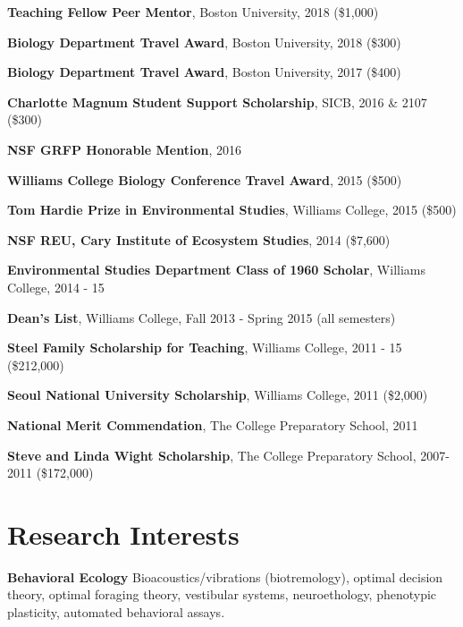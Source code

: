 \documentclass[margin,line]{res}
\begin{document}
\begin{resume}
{\bf Teaching Fellow Peer Mentor}, Boston University, 2018 (\$1,000)
\vspace*{-3.5mm}

{\bf Biology Department Travel Award}, Boston University, 2018 (\$300)
\vspace*{-3.5mm}

{\bf Biology Department Travel Award}, Boston University, 2017 (\$400)
\vspace*{-3.5mm}

{\bf Charlotte  Magnum	Student	Support	Scholarship}, SICB, 2016 \& 2107 (\$300)
\vspace*{-3.5mm}

{\bf NSF GRFP Honorable Mention}, 2016 
\vspace*{-3.5mm}

{\bf Williams College Biology Conference Travel Award}, 2015 (\$500)
\vspace*{-3.5mm}

{\bf Tom Hardie Prize in Environmental Studies}, Williams College, 2015 (\$500)
\vspace*{-3.5mm}

{\bf NSF REU, Cary Institute of Ecosystem Studies}, 2014 (\$7,600)
\vspace*{-3.5mm}

{\bf Environmental Studies Department Class of 1960 Scholar}, Williams College, 2014 - 15
\vspace*{-3.5mm}

{\bf Dean's List}, Williams College, Fall 2013 - Spring 2015 (all semesters)
\vspace*{-3.5mm}

{\bf Steel Family Scholarship for Teaching}, Williams College, 2011 - 15 (\$212,000)
\vspace*{-3.5mm}

{\bf Seoul National University Scholarship}, Williams College, 2011 (\$2,000)
\vspace*{-3.5mm}

{\bf National Merit Commendation}, The College Preparatory School, 2011
\vspace*{-3.5mm}

{\bf Steve and Linda Wight Scholarship}, The College Preparatory School, 2007-2011 (\$172,000)

\section{\sc Research Interests}
{\bf Behavioral Ecology} Bioacoustics/vibrations (biotremology), optimal decision theory, optimal foraging theory, vestibular systems, neuroethology, phenotypic plasticity, automated behavioral assays.


\end{resume}
\end{document}
